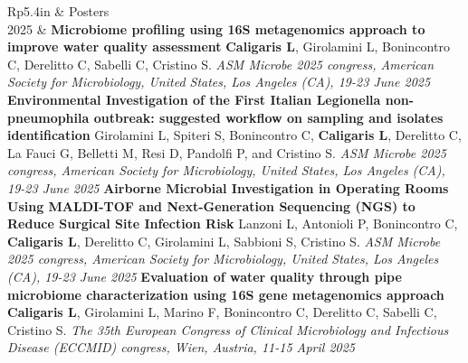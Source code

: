 \documentclass[letterpaper, 11pt]{article}
\newcommand{\headingfont}{\Large\color{OliveGreen}}
\newenvironment{SectionTable}[1]{
	\renewcommand*{\arraystretch}{1.7}
	\setlength{\tabcolsep}{10pt}
	\begin{longtable}{Rp{5.4in}} & #1 \\}
{\end{longtable}\vspace{-.3cm}}
\begin{document}
\begin{SectionTable}{\headingfont Posters}
2025 &
\textbf{Microbiome profiling using 16S metagenomics approach to improve water quality assessment}\newline
\textbf{Caligaris L}, Girolamini L, Bonincontro C, Derelitto C, Sabelli C, Cristino S.
\newline
\textit{ASM Microbe 2025 congress, American Society for Microbiology, United States, Los Angeles (CA), 19-23 June 2025} \newline
\textbf{Environmental Investigation of the First Italian Legionella non-pneumophila outbreak:  suggested workflow on sampling and isolates identification}\newline
Girolamini L, Spiteri S, Bonincontro C, \textbf{Caligaris L}, Derelitto C, La Fauci G, Belletti M, Resi D, Pandolfi P, and Cristino S. \newline
\textit{ASM Microbe 2025 congress, American Society for Microbiology, United States, Los Angeles (CA), 19-23 June 2025} \newline
\textbf{Airborne Microbial Investigation in Operating Rooms Using MALDI-TOF and Next-Generation Sequencing (NGS) to Reduce Surgical Site Infection Risk}\newline
Lanzoni L, Antonioli P, Bonincontro C, \textbf{Caligaris L}, Derelitto C, Girolamini L, Sabbioni S, Cristino S. \newline
\textit{ASM Microbe 2025 congress, American Society for Microbiology, United States, Los Angeles (CA), 19-23 June 2025} \newline
\textbf{Evaluation of water quality through pipe microbiome characterization using 16S gene metagenomics approach} \newline
\textbf{Caligaris L}, Girolamini L, Marino F, Bonincontro C, Derelitto C, Sabelli C, Cristino S.  \newline
\textit{The 35th European Congress of Clinical Microbiology and Infectious Disease (ECCMID) congress, Wien, Austria, 11-15 April 2025} \\


\end{SectionTable}
\end{document}
